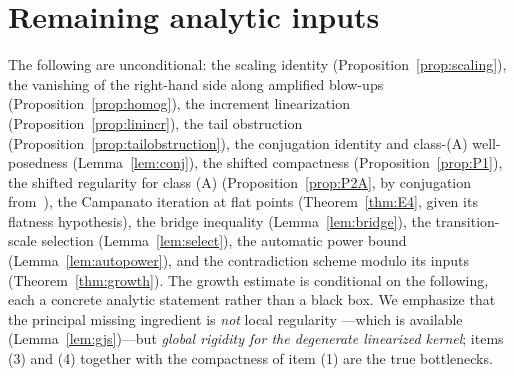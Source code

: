 \documentclass[11pt]{amsart}
\theoremstyle{plain}
\theoremstyle{definition}
\theoremstyle{remark}
\begin{document}
\section{Remaining analytic inputs}\label{sec:open}
The following are unconditional: the scaling identity
(Proposition~\ref{prop:scaling}), the vanishing of the right-hand side along
amplified blow-ups (Proposition~\ref{prop:homog}), the increment linearization
(Proposition~\ref{prop:linincr}), the tail obstruction
(Proposition~\ref{prop:tailobstruction}), the conjugation identity and
class-(A) well-posedness (Lemma~\ref{lem:conj}), the shifted compactness
(Proposition~\ref{prop:P1}), the shifted regularity for class (A)
(Proposition~\ref{prop:P2A}, by conjugation from~\cite{GJS}), the Campanato
iteration at flat points (Theorem~\ref{thm:E4}, given its flatness
hypothesis), the bridge inequality (Lemma~\ref{lem:bridge}), the
transition-scale selection (Lemma~\ref{lem:select}), the automatic power
bound (Lemma~\ref{lem:autopower}), and the contradiction scheme modulo
its inputs (Theorem~\ref{thm:growth}). The growth estimate is conditional on
the following, each a concrete analytic statement rather than a black box. We
emphasize that the principal missing ingredient is \emph{not} local regularity
---which is available (Lemma~\ref{lem:gjs})---but \emph{global rigidity for the
degenerate linearized kernel}; items (3) and (4) together with the compactness
of item (1) are the true bottlenecks.
\end{document}
